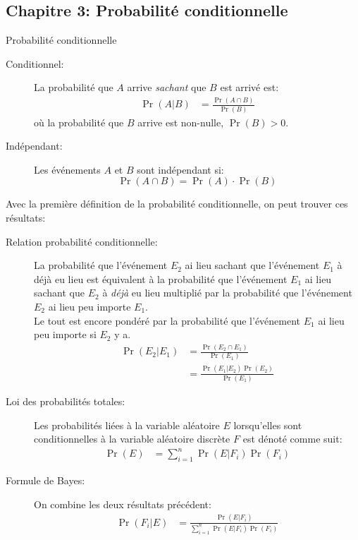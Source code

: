 \documentclass[10pt, french]{article}
\begin{document}
\begin{multicols*}{3}
\section{Chapitre 3: Probabilité conditionnelle}
\begin{probch3}{Probabilité conditionnelle}
\begin{description}
	\item[Conditionnel:]	La probabilité que $A$ arrive \textit{sachant} que $B$ est arrivé est: 
	\begin{align*}
		\Pr(A | B) 
		&= 	\frac{\Pr(A \cap B)}{\Pr(B)}	
	\end{align*}
	où la probabilité que $B$ arrive est non-nulle, $\Pr(B) > 0$.
	\item[Indépendant:]	Les événements $A$ et $B$ sont indépendant si:
	\begin{equation*}
		\Pr(A \cap B) = \Pr(A) \cdot \Pr(B)
	\end{equation*}
\end{description}
Avec la première définition de la probabilité conditionnelle, on peut trouver ces résultats:
\begin{description}
	\item[Relation probabilité conditionnelle: ]	La probabilité que l'événement $E_{2}$ ai lieu sachant que l'événement $E_{1}$ à déjà eu lieu est équivalent à la probabilité que l'événement $E_{1}$ ai lieu sachant que $E_{2}$ à \textit{déjà} eu lieu multiplié par la probabilité que l'événement $E_{2}$ ai lieu peu importe $E_{1}$. \\
	Le tout est encore pondéré par la probabilité que l'événement $E_{1}$ ai lieu peu importe si $E_{2}$ y a.
	\begin{align*}
		\Pr(E_{2} | E_{1})
		&= 	\frac{\Pr(E_{2} \cap E_{1})}{\Pr(E_{1})}		\\
		&=	\frac{\Pr(E_{1} | E_{2}) \Pr(E_{2})}{\Pr(E_{1})}		
	\end{align*}
	\item[Loi des probabilités totales: ]	Les probabilités liées à la variable aléatoire $E$ lorsqu'elles sont conditionnelles à la variable aléatoire discrète $F$ est dénoté comme suit:
	\begin{align*}
		\Pr(E)	&=	\sum_{i = 1}^{n} \Pr(E | F_{i}) \Pr(F_{i})
	\end{align*}
	\item[Formule de Bayes: ]	On combine les deux résultats précédent:
	\begin{align*}
		\Pr(F_{i} | E)
		&=	\frac{\Pr(E | F_{i})}{\sum_{i = 1}^{n} \Pr(E | F_{i}) \Pr(F_{i})}
	\end{align*}
\end{description}
\end{probch3}

\end{multicols*}
\end{document}
